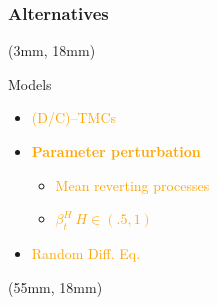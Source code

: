 \begin{frame}
    \frametitle{Alternatives}
    \begin{textblock*}{50mm}(3mm, 18mm)
        \begin{bluebox}{Models}
            \begin{itemize}
                \item
                    \textcolor<1>{orange}{(D/C)--TMCs}
                \item
                    \textcolor<2,3,4,5,7>{orange}{
                    \textbf<4-5,7>{%
                        Parameter perturbation
                    }
                }
                \begin{itemize}
                    \item
                        \textcolor<4>{orange}{
                            Mean reverting 
                            processes
                        }
                    \item
                        \textcolor<5>{orange}{
                            $
                                \beta_t^H \ H \in (\num{.5}, 1)
                            $
                        }
                \end{itemize}
                \item
                    \textcolor<6>{orange}{
                        Random Diff. Eq.
                    }
            \end{itemize}
        \end{bluebox}
    \end{textblock*}
    \begin{textblock*}{72mm}(55mm, 18mm)
       \begin{graybox}
            {%
                }
\end{graybox}
\end{textblock*}
\end{frame}

